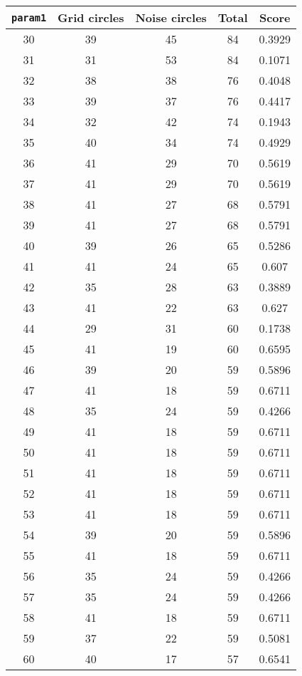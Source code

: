 \documentclass[letterpaper, 12pt]{article}
\begin{document}
\begin{longtable}{|c|c|c|c|c|}
\hline
\textbf{\texttt{param1}} & \textbf{Grid circles} & \textbf{Noise circles} & \textbf{Total} & \textbf{Score} \\
\hline
30 & 39 & 45 & 84 & 0.3929 \\
\hline
31 & 31 & 53 & 84 & 0.1071 \\
\hline
32 & 38 & 38 & 76 & 0.4048 \\
\hline
33 & 39 & 37 & 76 & 0.4417 \\
\hline
34 & 32 & 42 & 74 & 0.1943 \\
\hline
35 & 40 & 34 & 74 & 0.4929 \\
\hline
36 & 41 & 29 & 70 & 0.5619 \\
\hline
37 & 41 & 29 & 70 & 0.5619 \\
\hline
38 & 41 & 27 & 68 & 0.5791 \\
\hline
39 & 41 & 27 & 68 & 0.5791 \\
\hline
40 & 39 & 26 & 65 & 0.5286 \\
\hline
41 & 41 & 24 & 65 & 0.607 \\
\hline
42 & 35 & 28 & 63 & 0.3889 \\
\hline
43 & 41 & 22 & 63 & 0.627 \\
\hline
44 & 29 & 31 & 60 & 0.1738 \\
\hline
45 & 41 & 19 & 60 & 0.6595 \\
\hline
46 & 39 & 20 & 59 & 0.5896 \\
\hline
47 & 41 & 18 & 59 & 0.6711 \\
\hline
48 & 35 & 24 & 59 & 0.4266 \\
\hline
49 & 41 & 18 & 59 & 0.6711 \\
\hline
50 & 41 & 18 & 59 & 0.6711 \\
\hline
51 & 41 & 18 & 59 & 0.6711 \\
\hline
52 & 41 & 18 & 59 & 0.6711 \\
\hline
53 & 41 & 18 & 59 & 0.6711 \\
\hline
54 & 39 & 20 & 59 & 0.5896 \\
\hline
55 & 41 & 18 & 59 & 0.6711 \\
\hline
56 & 35 & 24 & 59 & 0.4266 \\
\hline
57 & 35 & 24 & 59 & 0.4266 \\
\hline
58 & 41 & 18 & 59 & 0.6711 \\
\hline
59 & 37 & 22 & 59 & 0.5081 \\
\hline
60 & 40 & 17 & 57 & 0.6541 \\

\end{longtable}
\end{document}

